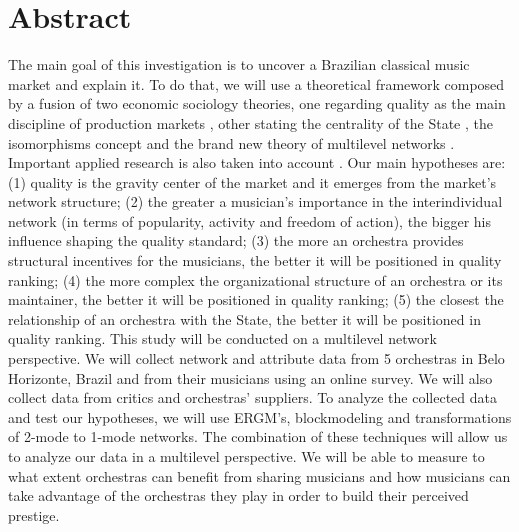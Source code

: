 \documentclass[a4paper, 12pt, openright, oneside, german, french, brazil, english, article]{abntex2}
\begin{document}
	\textual
	\maketitle
	
	\section*{Abstract}
		The main goal of this investigation is to uncover a Brazilian classical music market and explain it. To do that, we will use a theoretical framework composed by a fusion of two economic sociology theories, one regarding quality as the main discipline of production markets \cite{white2002markets}, other stating the centrality of the State \cite{fligstein2002architecture}, the isomorphisms concept \cite{dimaggio1983iron} and the brand new theory of multilevel networks \cite{lazega2016multilevel}. Important applied research is also taken into account \cite{favereau2002markets,franccois2005monde,biencourt2002market}. 
		Our main hypotheses are: (1) quality is the gravity center of the market and it emerges from the market's network structure; (2) the greater a musician's importance in the interindividual network (in terms of popularity, activity and freedom of action), the bigger his influence shaping the quality standard; (3) the more an orchestra provides structural incentives for the musicians, the better it will be positioned in quality ranking; (4) the more complex the organizational structure of an orchestra or its maintainer, the better it will be positioned in quality ranking; (5) the closest the relationship of an orchestra with the State, the better it will be positioned in quality ranking. This study will be conducted on a multilevel network perspective. We will collect network and attribute data from 5 orchestras in Belo Horizonte, Brazil and from their musicians using an online survey. We will also collect data from critics and orchestras' suppliers. To analyze the collected data and test our hypotheses, we will use ERGM's, blockmodeling and transformations of 2-mode to 1-mode networks. The combination of these techniques will allow us to analyze our data in a multilevel perspective. We will be able to measure to what extent orchestras can benefit from sharing musicians and how musicians can take advantage of the orchestras they play in order to build their perceived prestige.
		
\end{document}
